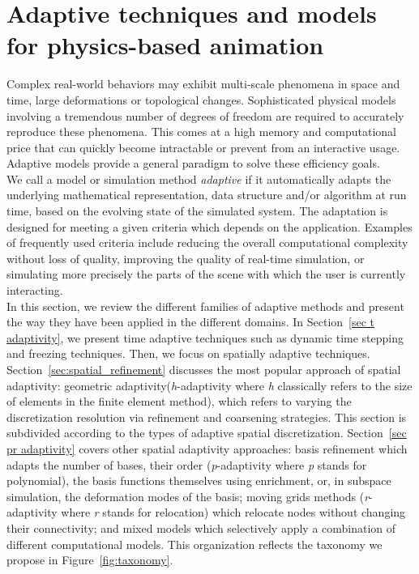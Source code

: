 \section[Adaptive physics-based animation]{Adaptive techniques and models for physics-based animation}
\label{sec:starAdaptivity}
Complex real-world behaviors may exhibit multi-scale phenomena in space and time, large deformations or topological changes.
Sophisticated physical models involving a tremendous number of degrees of freedom are required to accurately reproduce these phenomena.
This comes at a high memory and computational price that can quickly become intractable or prevent from an interactive usage.
Adaptive models provide a general paradigm to solve these efficiency goals.
\\
We call a model or simulation method \emph{adaptive} if it automatically adapts the underlying mathematical representation, data structure and/or algorithm at run time, based on the evolving state of the simulated system.
The adaptation is designed for meeting a given criteria which depends on the application. 
Examples of frequently used criteria include reducing the overall computational complexity without loss of quality, improving the quality of real-time simulation, or simulating more precisely the parts of the scene with which the user is currently interacting.
\\
In this section, we review the different families of adaptive methods and present the way they have been applied in the different domains. In Section~\ref{sec t adaptivity}, we present time adaptive techniques such as dynamic time stepping and freezing techniques.
Then, we focus on spatially adaptive techniques.
Section~\ref{sec:spatial_refinement} discusses the most popular approach of spatial adaptivity: geometric adaptivity(\textit{h}-adaptivity where \textit{h} classically refers to the size of elements in the finite element method), which refers to varying the discretization resolution via refinement and coarsening strategies. This section is subdivided according to the types of adaptive spatial discretization.
Section~\ref{sec pr adaptivity} covers other spatial adaptivity approaches: basis refinement which adapts the number of bases, their order (\textit{p}-adaptivity where \textit{p} stands for polynomial), the basis functions themselves using enrichment, or, in subspace simulation, the deformation modes of the basis; moving grids methods (\textit{r}-adaptivity where \textit{r} stands for relocation) which relocate nodes without changing their connectivity; and mixed models which selectively apply a combination of different computational models. This organization reflects the taxonomy we propose in Figure~\ref{fig:taxonomy}.
